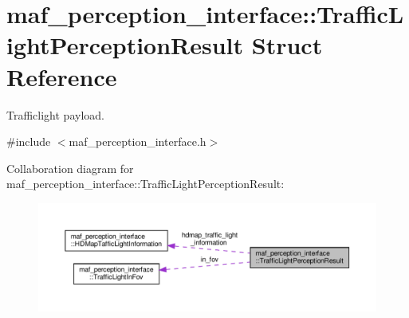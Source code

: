 \hypertarget{structmaf__perception__interface_1_1TrafficLightPerceptionResult}{}\section{maf\+\_\+perception\+\_\+interface\+:\+:Traffic\+Light\+Perception\+Result Struct Reference}
\label{structmaf__perception__interface_1_1TrafficLightPerceptionResult}


Trafficlight payload.  




{\ttfamily \#include $<$maf\+\_\+perception\+\_\+interface.\+h$>$}



Collaboration diagram for maf\+\_\+perception\+\_\+interface\+:\+:Traffic\+Light\+Perception\+Result\+:\nopagebreak
\begin{figure}[H]
\begin{center}
\leavevmode
\includegraphics[width=350pt]{structmaf__perception__interface_1_1TrafficLightPerceptionResult__coll__graph}
\end{center}
\end{figure}
